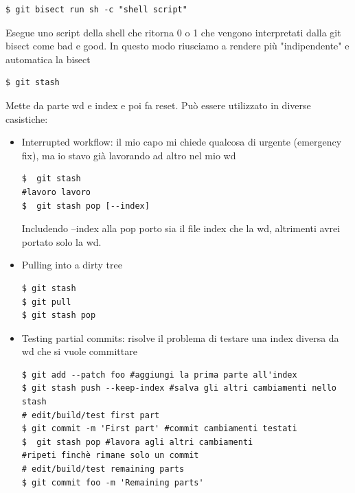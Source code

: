 \begin{verbatim}
$ git bisect run sh -c "shell script"
\end{verbatim}
Esegue uno script della shell che ritorna 0 o 1 che vengono interpretati dalla git bisect come bad e good. In questo modo riusciamo a rendere più "indipendente" e automatica la bisect

\begin{verbatim}
$ git stash
\end{verbatim}
Mette da parte wd e index e poi fa reset. Può essere utilizzato in diverse casistiche:
\begin{itemize}
    \item Interrupted workflow: il mio capo mi chiede qualcosa di urgente (emergency fix), ma io stavo già lavorando ad altro nel mio wd
    \begin{verbatim}
$  git stash
#lavoro lavoro
$  git stash pop [--index]
    \end{verbatim}
    Includendo --index alla pop porto sia il file index che la wd, altrimenti avrei portato solo la wd.
    \item Pulling into a dirty tree
    \begin{verbatim}
$ git stash
$ git pull
$ git stash pop 
    \end{verbatim}
    \item Testing partial commits: risolve il problema di testare una index diversa da wd che si vuole committare
    \begin{verbatim}
$ git add --patch foo #aggiungi la prima parte all'index
$ git stash push --keep-index #salva gli altri cambiamenti nello stash
# edit/build/test first part 
$ git commit -m 'First part' #commit cambiamenti testati
$  git stash pop #lavora agli altri cambiamenti
#ripeti finchè rimane solo un commit
# edit/build/test remaining parts 
$ git commit foo -m 'Remaining parts'
    \end{verbatim}
\end{itemize}

